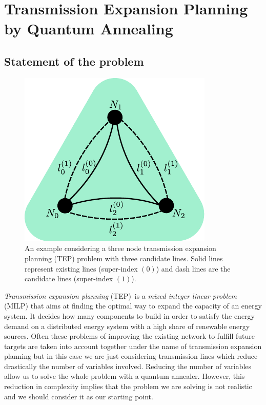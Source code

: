 \chapter{Transmission Expansion Planning by Quantum Annealing} %
\label{Chapter4} %
\section{Statement of the problem}
\begin{figure}
\includegraphics[scale=0.9]{Figures/3Node_Layer 1.pdf} 
\caption{An example considering a three node transmission expansion planning (TEP) problem with three candidate lines. Solid lines represent existing lines (super-index $(0)$) and dash lines are the candidate lines (super-index $(1)$).}
\label{fig:3node}
\end{figure}
\textit{Transmission expansion planning} (TEP)\,\cite{Neumann2020TransmissionFlows} is a \textit{mixed integer linear problem} (MILP) that aims at finding the optimal way to expand the capacity of an energy system. It decides how many components to build in order to satisfy the energy demand on a distributed energy system with a high share of renewable energy sources. Often these problems of improving the existing network to fulfill future targets are taken into account together under the name of transmission expansion planning but in this case we are just considering transmission lines which reduce drastically the number of variables involved. Reducing the number of variables allow us to solve the whole problem with a quantum annealer. However, this reduction in complexity implies that the problem we are solving is not realistic and we should consider it as our starting point. \\\\
